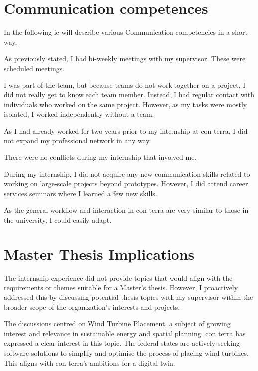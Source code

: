 \documentclass[11pt, titlepage, a4paper]{article}
\begin{document}
\section{Communication competences}
In the following ic will describe various Communication competencies in a short way.
\begin{description}[]
    \item[Supervisor Communication:] As previously stated, I had bi-weekly meetings with my supervisor. These were scheduled meetings.
    \item[Teamwork:] I was part of the team, but because teams do not work together on a project, I did not really get to know each team member. Instead, I had regular contact with individuals who worked on the same project. However, as my tasks were mostly isolated, I worked independently without a team.
    \item[Professional Network:] As I had already worked for two years prior to my internship at con terra, I did not expand my professional network in any way.
    \item[Conflicts:] There were no conflicts during my internship that involved me.
    \item[Communication Skills:]  During my internship, I did not acquire any new communication skills related to working on large-scale projects beyond prototypes. However, I did attend career services seminars where I learned a few new skills.
    \item[Applied Communication Skills:]  As the general workflow and interaction in con terra are very similar to those in the university, I could easily adapt.
\end{description}

\section{Master Thesis Implications}
The internship experience did not provide topics that would align with the requirements or themes suitable for a Master's thesis. However, I proactively addressed this by discussing potential thesis topics with my supervisor within the broader scope of the organization's interests and projects.

The discussions centred on Wind Turbine Placement, a subject of growing interest and relevance in sustainable energy and spatial planning. con terra has expressed a clear interest in this topic. The federal states are actively seeking software solutions to simplify and optimise the process of placing wind turbines. This aligns with con terra's ambitions for a digital twin.
\end{document}
